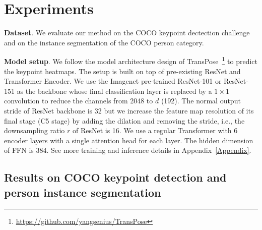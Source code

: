 \documentclass{article} \usepackage{iclr_conference,times}
\begin{document}
\section{Experiments}


\textbf{Dataset}. We evaluate our method on the COCO keypoint dectection challenge~\citep{coco:lin2014microsoft} and on the instance segmentation of the COCO person category.


\textbf{Model setup}.
 We follow the model architecture design of TransPose~\citep{transpose:yang2021transpose}\footnote{\url{https://github.com/yangsenius/TransPose}} to predict the keypoint heatmaps.
 The setup is built on top of pre-existing ResNet and Transformer Encoder. We use the Imagenet pre-trained ResNet-101 or ResNet-151 as the backbone whose final classification layer is replaced by a $1\times1$ convolution to reduce the channels from 2048 to $d$ (192).
The normal output stride of ResNet backbone is 32 but we increase the feature map resolution of its final stage (C5 stage) by adding the dilation and removing the stride, i.e., the downsampling ratio $r$ of ResNet is 16. 
We use a regular Transformer with 6 encoder layers with a single attention head for each layer. The hidden dimension of FFN is 384. See more training and inference details in Appendix~\ref{Appendix}.


\subsection{Results on COCO keypoint detection and person instance segmentation}
\end{document}
